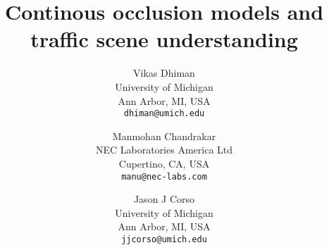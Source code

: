 \documentclass[10pt,twocolumn,letterpaper]{article}
\begin{document}
\title{Continous occlusion models and traffic scene understanding}
\author{Vikas Dhiman\\
  University of Michigan\\
  Ann Arbor, MI, USA\\
  {\tt\small dhiman@umich.edu}
  \and
  Manmohan Chandrakar\\
  NEC Laboratories America Ltd\\
  Cupertino, CA, USA\\
  {\tt\small manu@nec-labs.com}
  \and
  Jason J Corso\\
  University of Michigan\\
  Ann Arbor, MI, USA\\
  {\tt\small jjcorso@umich.edu}
}
\maketitle





% 








%




%

%

% 

\end{document}
